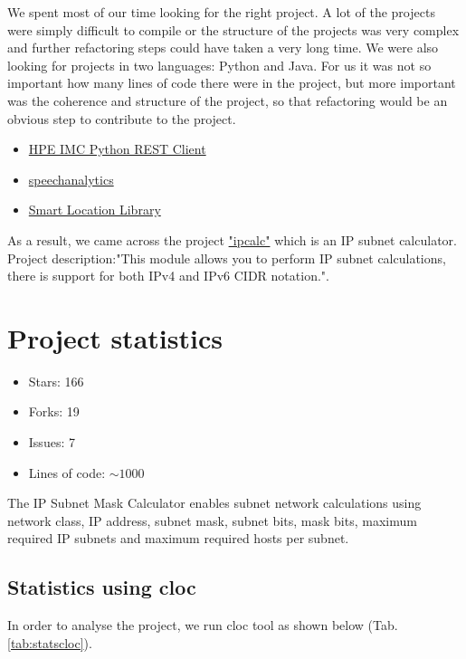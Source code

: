 \documentclass[unicode,11pt,a4paper,oneside,numbers=endperiod,openany]{scrartcl}
\begin{document}
We spent most of our time looking for the right project. A lot of the projects were simply difficult to compile or the structure of the projects was very complex and further refactoring steps could have taken a very long time. We were also looking for projects in two languages: Python and Java. For us it was not so important how many lines of code there were in the project, but more important was the coherence and structure of the project, so that refactoring would be an obvious step to contribute to the project.
\begin{itemize}
    \item \href{https://github.com/netmanchris/PYHPEIMC}{HPE IMC Python REST Client}
    \item \href{https://github.com/DinoTheDinosaur/speech_analytics}{speech\textunderscore analytics}
    \item \href{https://github.com/mrmans0n/smart-location-lib}{Smart Location Library}
\end{itemize}
As a result, we came across the project \href{https://github.com/tehmaze/ipcalc}{"ipcalc"} which is an IP subnet calculator. Project description:"This module allows you to perform IP subnet calculations, there is support for both IPv4 and IPv6 CIDR notation.". 
\newline
\section{Project statistics}
\begin{itemize}
    \item Stars: 166
    \item Forks: 19
    \item Issues: 7
    \item Lines of code: $\sim1000$
\end{itemize}
The IP Subnet Mask Calculator enables subnet network calculations using network class, IP address, subnet mask, subnet bits, mask bits, maximum required IP subnets and maximum required hosts per subnet.

\subsection{Statistics using cloc}
In order to analyse the project, we run cloc tool as shown below (Tab. \ref{tab:statscloc}). 
\end{document}
